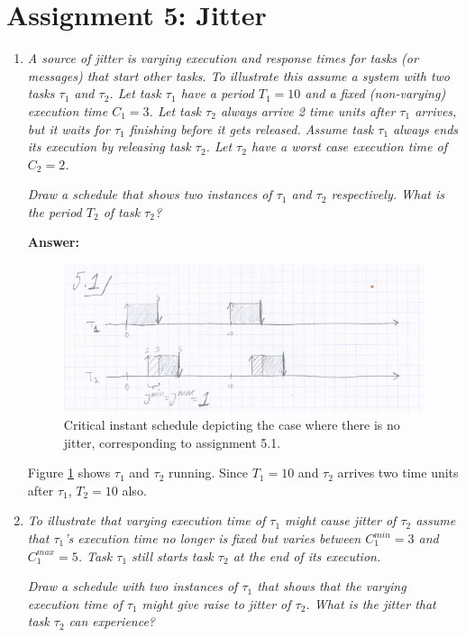\documentclass[a4paper,10pt]{article}
\newcommand{\answer}{\textbf{Answer: }}
\begin{document}
\section{Assignment 5: Jitter}

\begin{enumerate}
	\item \emph{A source of jitter is varying execution and response times for tasks (or messages) that start other tasks. To illustrate this assume a system with two tasks $\tau_1$ and $\tau_2$. Let task $\tau_1$ have a period $T_1 = 10$ and a fixed (non-varying) execution time $C_1 = 3$. Let task $\tau_2$ always arrive 2 time units after $\tau_1$ arrives, but it waits for $\tau_1$ finishing before it gets released. Assume task $\tau_1$ always ends its execution by releasing task $\tau_2$. Let $\tau_2$ have a worst case execution time of $C_2 = 2$.}
	
	\emph{Draw a schedule that shows two instances of $\tau_1$ and $\tau_2$ respectively. What is the period $T_2$ of task $\tau_2$?}
	
	\answer
	
	\begin{figure}
	\includegraphics[scale=0.4]{5_1_low}
	\caption{Critical instant schedule depicting the case where there is no jitter, corresponding to assignment 5.1.}
	\label{5_1}
	\end{figure}
	
	Figure \ref{5_1} shows $\tau_1$ and $\tau_2$ running. Since $T_1 = 10$ and $\tau_2$ arrives two time units after $\tau_1$, $T_2 = 10$ also.
	
	\item \emph{To illustrate that varying execution time of $\tau_1$ might cause jitter of $\tau_2$ assume that $\tau_1$'s execution time no longer is fixed but varies between $C_1^{min} = 3$ and $C_1^{max} = 5$. Task $\tau_1$ still starts task $\tau_2$ at the end of its execution.}
	
	\emph{Draw a schedule with two instances of $\tau_1$ that shows that the varying execution time of $\tau_1$ might give raise to jitter of $\tau_2$. What is the jitter that task $\tau_2$ can experience?}
		

\end{enumerate}
\end{document}
